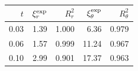 \begin{tabular}{@{}rrrrr@{}}
\toprule
$t$ & $\xi_r^{\rm exp}$ & $R_r^2$ & $\xi_\theta^{\rm exp}$ & $R_\theta^2$ \\
\midrule
0.03 & 1.39 & 1.000 & 6.36 & 0.979 \\
0.06 & 1.57 & 0.999 & 11.24 & 0.967 \\
0.10 & 2.99 & 0.901 & 17.37 & 0.963 \\
\bottomrule
\end{tabular}
